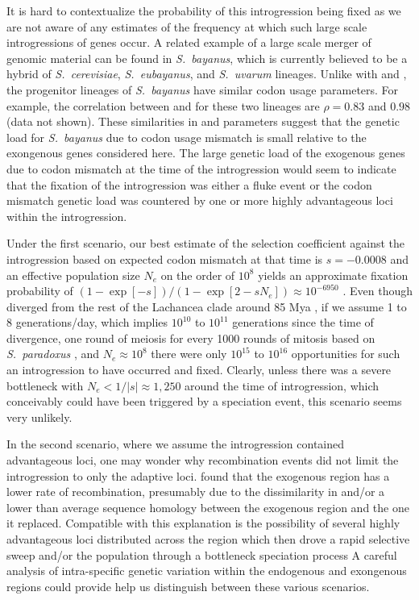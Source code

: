 It is hard to contextualize the probability of this introgression being fixed as we are not aware of any estimates of the frequency at which such large scale introgressions of genes occur.
A related example of a large scale merger of genomic material can be found in \emph{S.~bayanus}, which is currently believed to be a hybrid of \emph{S.~cerevisiae}, \emph{S.~eubayanus}, and \emph{S.~uvarum} lineages.
Unlike with \kluyveri and \gossypii, the  progenitor lineages of \emph{S.~bayanus} have similar codon usage parameters.
For example, the correlation between \DM and \DE for these two lineages are  $\rho = 0.83$ and  $0.98$ (data not shown).
These similarities in \DM and \DE parameters suggest that the genetic load for \emph{S.~bayanus} due to codon usage mismatch is small relative to the exongenous genes considered here. 
The large genetic load of the exogenous genes due to codon mismatch at the time of the introgression would seem to indicate that the fixation of the introgression was either a fluke event or the codon mismatch genetic load was countered by one or more highly advantageous loci within the introgression.

Under the  first scenario, our best estimate of the selection coefficient against the introgression based on expected codon mismatch at that time is $s = -0.0008$ and an effective population size $N_e$ on the order of $10^8$ \citep{wagner2005} yields an approximate fixation probability of $(1-\exp[- s])/(1-\exp[2 - sN_e]) \approx 10^{-6950}$ \citep{SellaAndHirsh2005}.
Even though \kluyveri diverged from the rest of the Lachancea clade around 85 Mya \citep{kensche2008, MHM2015}, if we assume 1 to 8 generations/day, which implies $10^{10}$ to $10^{11}$ generations since the time of divergence, one round of meiosis for every 1000 rounds of mitosis based on \emph{S.~paradoxus} \citep{tsai2008}, and $N_e \approx 10^8$ there were only $10^{15}$ to $10^{16}$ opportunities for such an introgression to have occurred and fixed.
Clearly, unless there was a severe bottleneck with $N_e < 1/|s| \approx 1,250$ around the time of introgression, which conceivably could have been triggered by a speciation event, this scenario seems very unlikely.

In the second scenario, where we assume the introgression contained advantageous loci, one may wonder why recombination events did not limit the introgression to only the adaptive loci.
\citet{payen2009} found that the exogenous region has a lower rate of recombination, presumably due to the dissimilarity in \GC and/or a lower than average sequence homology between the exogenous region and the one it replaced.
Compatible with this explanation is the possibility of several highly advantageous loci distributed across the region which then drove a rapid selective sweep and/or the population through a bottleneck speciation process
A careful analysis of intra-specific genetic variation within the endogenous and exongenous regions could provide help us distinguish between these various scenarios.



